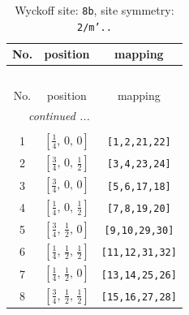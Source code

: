 \documentclass[fleqn,8pt]{jsarticle}
\begin{document}
\begin{longtable}{ccc}
\caption{Wyckoff site: {\tt 8b}, site symmetry: {\tt 2/m'..}}
 \\
 \hline \hline
No. & position & mapping \\ \hline \endfirsthead

\multicolumn{2}{l}{\tablename\ \thetable{}} \\
 \hline \hline
No. & position & mapping \\ \hline \endhead

 \hline \hline
\multicolumn{2}{r}{\footnotesize\it continued ...} \\ \endfoot

 \hline \hline
\multicolumn{2}{r}{} \\ \endlastfoot

1 & $\left[ \frac{1}{4},\, 0,\, 0 \right]$ & {\tt [1,2,21,22]} \\ \hline
2 & $\left[ \frac{3}{4},\, 0,\, \frac{1}{2} \right]$ & {\tt [3,4,23,24]} \\ \hline
3 & $\left[ \frac{3}{4},\, 0,\, 0 \right]$ & {\tt [5,6,17,18]} \\ \hline
4 & $\left[ \frac{1}{4},\, 0,\, \frac{1}{2} \right]$ & {\tt [7,8,19,20]} \\ \hline
5 & $\left[ \frac{3}{4},\, \frac{1}{2},\, 0 \right]$ & {\tt [9,10,29,30]} \\ \hline
6 & $\left[ \frac{1}{4},\, \frac{1}{2},\, \frac{1}{2} \right]$ & {\tt [11,12,31,32]} \\ \hline
7 & $\left[ \frac{1}{4},\, \frac{1}{2},\, 0 \right]$ & {\tt [13,14,25,26]} \\ \hline
8 & $\left[ \frac{3}{4},\, \frac{1}{2},\, \frac{1}{2} \right]$ & {\tt [15,16,27,28]} \\
\end{longtable}
\renewcommand{\arraystretch}{1.2}
\end{document}
